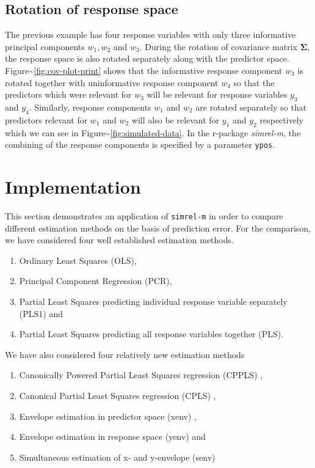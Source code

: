 \documentclass[12pt,A4paper,authoryear]{elsarticle} %
\providecommand{\tightlist}{%
  \setlength{\itemsep}{0pt}\setlength{\parskip}{0pt}}
\theoremstyle{definition}
\theoremstyle{definition}
\theoremstyle{remark}
\begin{document}
\hypertarget{rotation-of-response-space}{\subsection{Rotation of
response space}\label{rotation-of-response-space}}

The previous example has four response variables with only three
informative principal components \(w_1, w_2\) and \(w_3\). During the
rotation of covariance matrix \(\boldsymbol{\Sigma}\), the response
space is also rotated separately along with the predictor space.
Figure\textasciitilde{}\ref{fig:cov-plot-print} shows that the
informative response component \(w_3\) is rotated together with
uninformative response component \(w_4\) so that the predictors which
were relevant for \(w_3\) will be relevant for response variables
\(y_3\) and \(y_4\). Similarly, response components \(w_1\) and \(w_2\)
are rotated separately so that predictors relevant for \(w_1\) and
\(w_2\) will also be relevant for \(y_1\) and \(y_2\) respectively which
we can see in Figure\textasciitilde{}\ref{fig:simulated-data}. In the
r-package \emph{simrel-m}, the combining of the response components is
specified by a parameter \texttt{ypos}.

\hypertarget{implementation}{\section{Implementation}\label{implementation}}

This section demonstrates an application of \texttt{simrel-m} in order
to compare different estimation methods on the basis of prediction
error. For the comparison, we have considered four well established
estimation methods.

\begin{enumerate}
\def\labelenumi{\alph{enumi})}
\tightlist
\item
  Ordinary Least Squares (OLS),
\item
  Principal Component Regression (PCR),
\item
  Partial Least Squares predicting individual response variable
  separately (PLS1) and
\item
  Partial Least Squares predicting all response variables together
  (PLS).
\end{enumerate}

We have also considered four relatively new estimation methods

\begin{enumerate}
\def\labelenumi{\alph{enumi})}
\tightlist
\item
  Canonically Powered Partial Least Squares regression (CPPLS)
  \citep{indahl2009canonical},
\item
  Canonical Partial Least Squares regression (CPLS)
  \citep{indahl2009canonical},
\item
  Envelope estimation in predictor space (xenv)
  \citep{cook2010envelope},
\item
  Envelope estimation in response space (yenv)
  \citep{cook2015foundations} and
\item
  Simultaneous estimation of x- and y-envelope (senv)
  \citep{cook2015simultaneous}
\end{enumerate}
\end{document}
